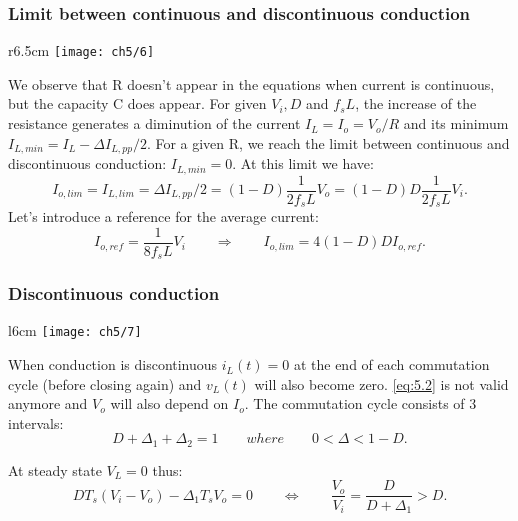 		\subsubsection{Limit between continuous and discontinuous conduction}
			\begin{wrapfigure}[5]{r}{6.5cm}
			\vspace{-5mm}
			\texttt{[image: ch5/6]}
			\end{wrapfigure}
			We observe that R doesn't appear in the equations when current is continuous, but the capacity C does appear. For given $V_i, D$ and $f_s L$, the increase of the resistance generates a diminution of the current $I_L = I_o = V_o/R$ and its minimum $I_{L,min}=I_L - \Delta I_{L,pp}/2$. For a given R, we reach the limit between continuous and discontinuous conduction: $I_{L,min}=0$. At this limit we have:
			\begin{equation}
				I_{o,lim} = I_{L,lim} = \Delta I_{L,pp}/2 = (1-D)\frac{1}{2f_sL}V_o = (1-D)D\frac{1}{2f_sL}V_i.
			\end{equation}
			Let's introduce a reference for the average current:
			\begin{equation}
				I_{o,ref} = \frac{1}{8f_sL}V_i \qquad \Rightarrow \qquad I_{o,lim} = 4(1-D)DI_{o,ref}.
			\end{equation}
			
		\subsubsection{Discontinuous conduction}
			\begin{wrapfigure}[7]{l}{6cm}
			\vspace{0mm}
			\texttt{[image: ch5/7]}
			\end{wrapfigure}	
			When conduction is discontinuous $i_L(t) = 0$ at the end of each commutation cycle (before closing again) and $v_L(t)$ will also become zero. \eqref{eq:5.2} is not valid anymore and $V_o$ will also depend on $I_o$. The commutation cycle consists of 3 intervals:
			\begin{equation}
				D + \Delta _1 + \Delta _2 = 1 \qquad where \qquad 0<\Delta < 1-D.
			\end{equation}
			
			At steady state $V_L = 0$ thus:
			\begin{equation}
				DT_s (V_i - V_o) - \Delta _1 T_s V_o = 0 \qquad \Leftrightarrow \qquad \frac{V_o}{V_i} = \frac{D}{D+\Delta _1} > D. 
			\end{equation}
			
